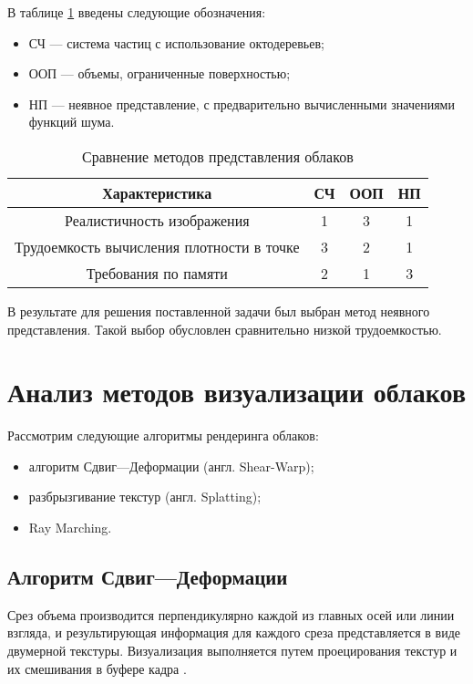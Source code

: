 В таблице \ref{tbl:repr_choice} введены следующие обозначения:
\begin{itemize}
	\item СЧ --- система частиц с использование октодеревьев;
	\item ООП --- объемы, ограниченные поверхностью;
	\item НП --- неявное представление, с предварительно вычисленными значениями функций шума.
\end{itemize} 

\begin{table}[h]
	\begin{center}
		\begin{threeparttable}
			\captionsetup{justification=raggedright,singlelinecheck=off}
			\caption{Сравнение методов представления облаков}
			\label{tbl:repr_choice}
			\begin{tabular}{|c|c|c|c|}
				\hline
				Характеристика &  СЧ  & ООП & НП \\
				\hline
				Реалистичность изображения &  1  & 3 & 1 \\
				\hline
				Трудоемкость вычисления плотности в точке &  3  & 2 & 1 \\
				\hline
				Требования по памяти & 2 & 1 & 3 \\
				\hline
			\end{tabular}
		\end{threeparttable}
	\end{center}
\end{table}

В результате для решения поставленной задачи был выбран метод неявного представления. Такой выбор обусловлен сравнительно низкой трудоемкостью.


\section{Анализ методов визуализации облаков}

Рассмотрим следующие алгоритмы рендеринга облаков:

\begin{itemize}
	\item алгоритм Сдвиг---Деформации (англ. Shear-Warp);
	\item разбрызгивание текстур (англ. Splatting);
	\item Ray Marching.
\end{itemize}


\subsection{Алгоритм Сдвиг---Деформации}
\label{slice}
Срез объема производится перпендикулярно каждой из главных осей или линии взгляда, и результирующая информация для каждого среза представляется в виде двумерной текстуры. Визуализация выполняется путем проецирования текстур и их смешивания в буфере кадра \cite{vs}. 

